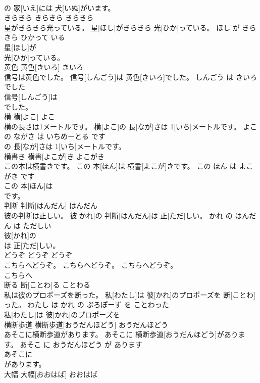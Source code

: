 \documentclass[8pt]{extreport}
\begin{document}
\begin{CJK}{UTF8}{min}
\\	の 家[いえ]には 犬[いぬ]がいます。			
\\	きらきら	きらきら	きらきら	
\\	星がきらきら光っている。	星[ほし]がきらきら 光[ひか]っている。	ほし が きらきら ひかって いる	
\\	星[ほし]が
\\	光[ひか]っている。			
\\	黄色	黄色[きいろ]	きいろ	
\\	信号は黄色でした。	信号[しんごう]は 黄色[きいろ]でした。	しんごう は きいろ でした	
\\	信号[しんごう]は
\\	でした。			
\\	横	横[よこ]	よこ	
\\	横の長さは1メートルです。	横[よこ]の 長[なが]さは 1[いち]メートルです。	よこ の ながさ は いちめーとる です	
\\	の 長[なが]さは 1[いち]メートルです。			
\\	横書き	横書[よこが]き	よこがき	
\\	この本は横書きです。	この 本[ほん]は 横書[よこが]きです。	この ほん は よこがき です	
\\	この 本[ほん]は
\\	です。			
\\	判断	判断[はんだん]	はんだん	
\\	彼の判断は正しい。	彼[かれ]の 判断[はんだん]は 正[ただ]しい。	かれ の はんだん は ただしい	
\\	彼[かれ]の
\\	は 正[ただ]しい。			
\\	どうぞ	どうぞ	どうぞ	
\\	こちらへどうぞ。	こちらへどうぞ。	こちらへどうぞ。	
\\	こちらへ
\\	断る	断[ことわ]る	ことわる	
\\	私は彼のプロポーズを断った。	私[わたし]は 彼[かれ]のプロポーズを 断[ことわ]った。	わたし は かれ の ぷろぽーず を ことわった	
\\	私[わたし]は 彼[かれ]のプロポーズを
\\	横断歩道	横断歩道[おうだんほどう]	おうだんほどう	
\\	あそこに横断歩道があります。	あそこに 横断歩道[おうだんほどう]があります。	あそこ に おうだんほどう が あります	
\\	あそこに
\\	があります。			
\\	大幅	大幅[おおはば]	おおはば	

\end{CJK}
\end{document}
